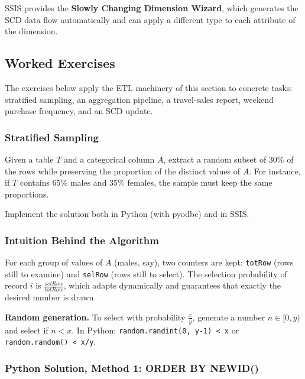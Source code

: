SSIS provides the \textbf{Slowly Changing Dimension Wizard}, which generates the SCD data flow automatically and can apply a different type to each attribute of the dimension.


\subsection{Worked Exercises}
\label{sec:etl-worked-exercises}
\label{etl_ex}

The exercises below apply the ETL machinery of this section to concrete tasks: stratified sampling, an aggregation pipeline, a travel-sales report, weekend purchase frequency, and an SCD update.

\subsubsection{Stratified Sampling}
\label{subsec:ex-stratified-sampling}
\label{stratifiedSampling_appendix}

\begin{theorybox}[frametitle={Exercise}]
Given a table $T$ and a categorical column $A$, extract a random subset of 30\% of the rows while preserving the proportion of the distinct values of $A$. For instance, if $T$ contains 65\% males and 35\% females, the sample must keep the same proportions.

Implement the solution both in Python (with pyodbc) and in SSIS.
\end{theorybox}

\subsubsection*{Intuition Behind the Algorithm}

For each group of values of $A$ (males, say), two counters are kept: \texttt{totRow} (rows still to examine) and \texttt{selRow} (rows still to select). The selection probability of record $i$ is $\frac{selRow}{totRow}$, which adapts dynamically and guarantees that exactly the desired number is drawn.

\begin{notebox}
\textbf{Random generation.} To select with probability $\frac{x}{y}$, generate a number $n \in [0, y)$ and select if $n < x$. In Python: \texttt{random.randint(0, y-1) < x} or \texttt{random.random() < x/y}.
\end{notebox}

\subsubsection*{Python Solution, Method 1: ORDER BY NEWID()}


